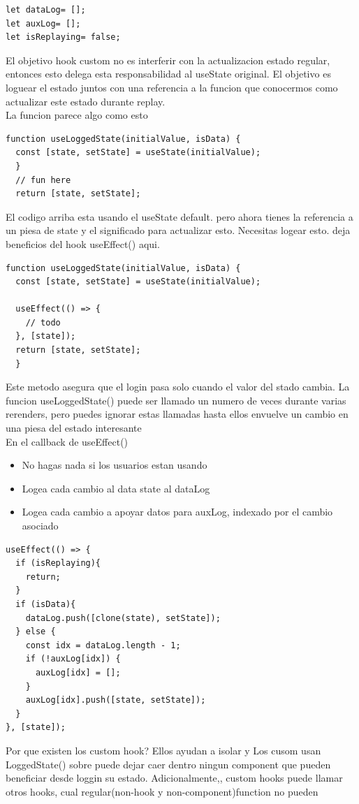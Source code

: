 \begin{lstlisting}[language=html]
let dataLog= [];
let auxLog= [];
let isReplaying= false;
\end{lstlisting}
El objetivo hook custom no es interferir con la actualizacion estado regular, entonces esto delega esta responsabilidad al useState original. El objetivo es loguear el estado juntos con una referencia a la funcion que conocermos como actualizar este estado durante replay.\\
La funcion parece algo como esto
\begin{lstlisting}[language=html]
function useLoggedState(initialValue, isData) {
  const [state, setState] = useState(initialValue);
  }
  // fun here
  return [state, setState];
\end{lstlisting}
El codigo arriba esta usando el useState default. pero ahora tienes la referencia a un piesa de state y el significado para actualizar esto. Necesitas logear esto. deja beneficios del hook useEffect() aqui.
\begin{lstlisting}[language=html]
function useLoggedState(initialValue, isData) {
  const [state, setState] = useState(initialValue);

  useEffect(() => {
    // todo
  }, [state]);
  return [state, setState];
  }
\end{lstlisting}
Este metodo asegura que el login pasa solo cuando el valor del stado cambia. La funcion useLoggedState() puede ser llamado un numero de veces durante varias rerenders, pero puedes ignorar estas llamadas hasta ellos envuelve un cambio en una piesa del estado interesante\\
En el callback de useEffect()
\begin{itemize}
  \item No hagas nada si los usuarios estan usando
  \item Logea cada cambio al data state al dataLog
  \item Logea cada cambio a apoyar datos para auxLog, indexado por el cambio asociado
\end{itemize}
\begin{lstlisting}[language=html]
useEffect(() => {
  if (isReplaying){
    return;
  }
  if (isData){
    dataLog.push([clone(state), setState]);
  } else {
    const idx = dataLog.length - 1;
    if (!auxLog[idx]) {
      auxLog[idx] = [];
    }
    auxLog[idx].push([state, setState]);
  }
}, [state]);
\end{lstlisting}
Por que existen los custom hook? Ellos ayudan a isolar y Los cusom usan LoggedState() sobre puede dejar caer dentro ningun component que pueden beneficiar desde loggin su estado. Adicionalmente,, custom hooks puede llamar otros hooks, cual regular(non-hook y non-component)function no pueden \\
